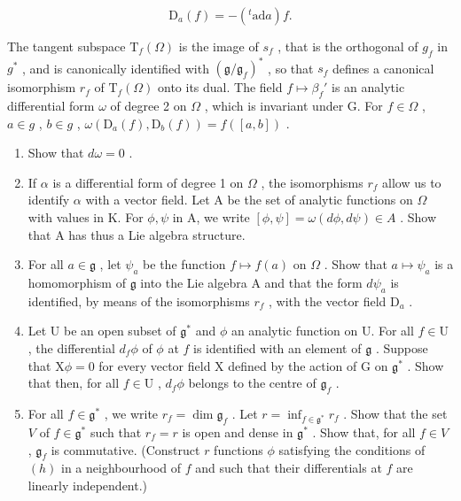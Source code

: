 \[
\mathrm{D} _ {a} (f) = - (^ {t} \mathrm{ad} a) f.
\]

The tangent subspace \(\mathrm{T}_{f}(\Omega)\) is the image of \(s_{f}\) , that is the orthogonal of \(g_{f}\) in \(g^{*}\) , and is canonically identified with \((\mathfrak{g}/\mathfrak{g}_{f})^{*}\) , so that \(s_{f}\) defines a canonical isomorphism \(r_{f}\) of \(\mathrm{T}_{f}(\Omega)\) onto its dual. The field \(f \mapsto \beta_{f}'\) is an analytic differential form \(\omega\) of degree 2 on \(\Omega\) , which is invariant under G. For \(f \in \Omega\) , \(a \in g\) , \(b \in g\) , \(\omega(\mathrm{D}_{a}(f), \mathrm{D}_{b}(f)) = f([a, b])\) .

\begin{enumerate}
\def\labelenumi{(\alph{enumi})}
\setcounter{enumi}{4}
\item
  Show that \(d\omega = 0\) .
\item
  If \(\alpha\) is a differential form of degree 1 on \(\Omega\) , the isomorphisms \(r_f\) allow us to identify \(\alpha\) with a vector field. Let A be the set of analytic functions on \(\Omega\) with values in K. For \(\phi, \psi\) in A, we write \([\phi, \psi] = \omega(d\phi, d\psi) \in A\) . Show that A has thus a Lie algebra structure.
\item
  For all \(a \in \mathfrak{g}\) , let \(\psi_{a}\) be the function \(f \mapsto f(a)\) on \(\Omega\) . Show that \(a \mapsto \psi_{a}\) is a homomorphism of \(\mathfrak{g}\) into the Lie algebra A and that the form \(d\psi_{a}\) is identified, by means of the isomorphisms \(r_{f}\) , with the vector field \(\mathrm{D}_{a}\) .
\item
  Let U be an open subset of \(\mathfrak{g}^*\) and \(\phi\) an analytic function on U. For all \(f\in \mathrm{U}\) , the differential \(d_{f}\phi\) of \(\phi\) at \(f\) is identified with an element of \(\mathfrak{g}\) . Suppose that \(\mathrm{X}\phi = 0\) for every vector field X defined by the action of G on \(\mathfrak{g}^*\) . Show that then, for all \(f\in \mathrm{U}\) , \(d_{f}\phi\) belongs to the centre of \(\mathfrak{g}_f\) .
\item
  For all \(f \in \mathfrak{g}^*\) , we write \(r_f = \dim \mathfrak{g}_f\) . Let \(r = \inf_{f \in \mathfrak{g}^*} r_f\) . Show that the set \(V\) of \(f \in \mathfrak{g}^*\) such that \(r_f = r\) is open and dense in \(\mathfrak{g}^*\) . Show that, for all \(f \in V\) , \(\mathfrak{g}_f\) is commutative. (Construct \(r\) functions \(\phi\) satisfying the conditions of \((h)\) in a neighbourhood of \(f\) and such that their differentials at \(f\) are linearly independent.)
\end{enumerate}

